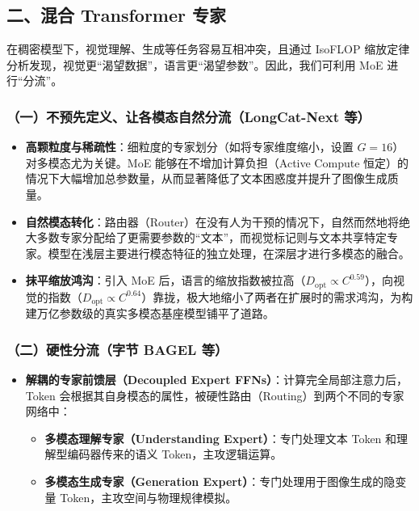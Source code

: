 \hypertarget{ux4e8cux6df7ux5408-transformer-ux4e13ux5bb6}{%
\subsection{二、混合 Transformer 专家}\label{ux4e8cux6df7ux5408-transformer-ux4e13ux5bb6}}

在稠密模型下，视觉理解、生成等任务容易互相冲突，且通过 IsoFLOP 缩放定律分析发现，视觉更``渴望数据''，语言更``渴望参数''。因此，我们可利用 MoE 进行``分流''。

\hypertarget{ux4e00ux4e0dux9884ux5148ux5b9aux4e49ux8ba9ux5404ux6a21ux6001ux81eaux7136ux5206ux6d41longcat-next-ux7b49}{%
\subsubsection{（一）不预先定义、让各模态自然分流（LongCat-Next 等）}\label{ux4e00ux4e0dux9884ux5148ux5b9aux4e49ux8ba9ux5404ux6a21ux6001ux81eaux7136ux5206ux6d41longcat-next-ux7b49}}

\begin{itemize}
\tightlist
\item
  \textbf{高颗粒度与稀疏性}：细粒度的专家划分（如将专家维度缩小，设置 \(G=16\)）对多模态尤为关键。MoE 能够在不增加计算负担（Active Compute 恒定）的情况下大幅增加总参数量，从而显著降低了文本困惑度并提升了图像生成质量。
\item
  \textbf{自然模态转化}：路由器（Router）在没有人为干预的情况下，自然而然地将绝大多数专家分配给了更需要参数的``文本''，而视觉标记则与文本共享特定专家。模型在浅层主要进行模态特征的独立处理，在深层才进行多模态的融合。
\item
  \textbf{抹平缩放鸿沟}：引入 MoE 后，语言的缩放指数被拉高（\(D_{\mathrm{opt}}\propto C^{0.59}\)），向视觉的指数（\(D_{\mathrm{opt}}\propto C^{0.64}\)）靠拢，极大地缩小了两者在扩展时的需求鸿沟，为构建万亿参数级的真实多模态基座模型铺平了道路。
\end{itemize}

\hypertarget{ux4e8cux786cux6027ux5206ux6d41ux5b57ux8282-bagel-ux7b49}{%
\subsubsection{（二）硬性分流（字节 BAGEL 等）}\label{ux4e8cux786cux6027ux5206ux6d41ux5b57ux8282-bagel-ux7b49}}

\begin{itemize}
\tightlist
\item
  \textbf{解耦的专家前馈层（Decoupled Expert FFNs）}：计算完全局部注意力后，Token 会根据其自身模态的属性，被硬性路由（Routing）到两个不同的专家网络中：

  \begin{itemize}
  \tightlist
  \item
    \textbf{多模态理解专家（Understanding Expert）}：专门处理文本 Token 和理解型编码器传来的语义 Token，主攻逻辑运算。
  \item
    \textbf{多模态生成专家（Generation Expert）}：专门处理用于图像生成的隐变量 Token，主攻空间与物理规律模拟。
  \end{itemize}
\end{itemize}

